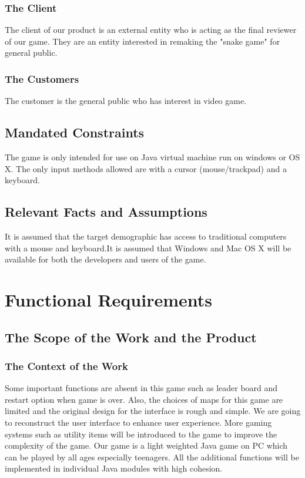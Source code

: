 \documentclass[12pt, titlepage]{article}
\begin{document}
\subsubsection{The Client}
The client of our product is an external entity who is acting as the final reviewer of our game. They are an entity interested in remaking the "snake game" for general public.

\subsubsection{The Customers}
The customer is the general public who has interest in video game.

\subsection{Mandated Constraints}
The game is only intended for use on Java virtual machine run on windows or OS X.
The only input methods allowed are with a cursor (mouse/trackpad) and a keyboard. 

\subsection{Relevant Facts and Assumptions}
It is assumed that the target demographic has access to traditional computers with a mouse and keyboard.It is assumed that Windows and Mac OS X will be available for both the developers and users of the game.

\section{Functional Requirements}

\subsection{The Scope of the Work and the Product}

\subsubsection{The Context of the Work}
Some important functions are absent in this game such as leader board and restart option when game is over. Also, the choices of maps for this game are limited and the original design for the interface is rough and simple. We are going to reconstruct the user interface to enhance user experience. More gaming systems such as utility items will be introduced to the game to improve the complexity of the game. Our game is a light weighted Java game on PC which can be played by all ages especially teenagers. All the additional functions will be implemented in individual Java modules with high cohesion.
\end{document}
